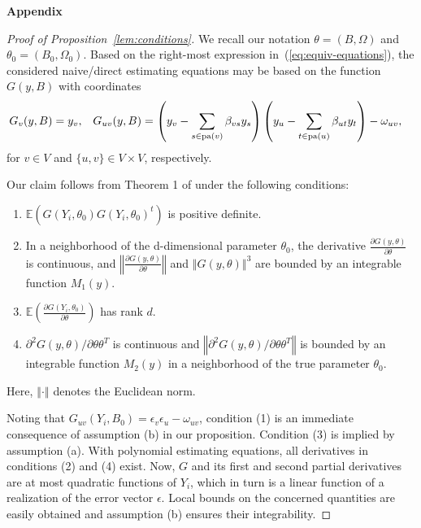 \documentclass[notitlepage]{article}
\newcommand{\pa}{{\rm pa}}       %
\begin{document}
\bigskip
{\bf Appendix}
\smallskip

\begin{proof}[Proof of Proposition~\ref{lem:conditions}]
  We recall our notation $\theta=(B,\Omega)$ and
  $\theta_0=(B_0,\Omega_0)$.  Based on the right-most expression
  in~(\ref{eq:equiv-equations}), the considered naive/direct
  estimating equations may be based on the function $G(y,B)$ with
  coordinates
  \begin{align*}
    G_v(y, B) &= y_v, & G_{uv}(y,B) &= \left(y_v-
      \sum_{s\in\pa(v)}\beta_{vs}y_s\right)\left(y_u-
      \sum_{t\in\pa(u)}\beta_{ut}y_t\right) -\omega_{uv},
  \end{align*}
  for $v\in V$ and $\{u,v\} \in V \times V$, respectively.

  Our claim follows from Theorem 1 of \citet{qin1994empirical} under
  the following conditions:
  \begin{enumerate}[label=(\arabic*)]
  \item $\mathbb{E}(G(Y_i, \theta_0)G(Y_i, \theta_0)^t)$ is positive definite.
  \item In a neighborhood of the d-dimensional parameter $\theta_0$,
    the derivative $\frac{\partial G(y, \theta)}{\partial \theta}$ is
    continuous, and
    $\left\Vert \frac{\partial G(y, \theta)}{\partial \theta}
    \right\Vert$ and $\left \Vert G(y, \theta)\right\Vert^3$ are
    bounded by an integrable function $M_1(y)$.
  \item $\mathbb{E}\left( \frac{\partial G(Y_i, \theta_0)}{\partial \theta}\right)$ has rank $d$.
  \item $\partial^2 G(y, \theta) / \partial \theta \theta^T$ is continuous and $\left\Vert\partial^2 G(y, \theta) / \partial \theta \theta^T \right\Vert$ is bounded by an integrable function $M_2(y)$ in a neighborhood of the true parameter $\theta_0$.
  \end{enumerate}
  Here, $\left\Vert \cdot \right\Vert$ denotes the Euclidean norm.

  Noting that $G_{uv}(Y_i,B_0)=\epsilon_v\epsilon_u-\omega_{uv}$,
  condition (1) is an immediate consequence of assumption (b) in our
  proposition.  Condition (3) is implied by assumption (a).  With
  polynomial estimating equations, all derivatives in conditions (2)
  and (4) exist.  Now, $G$ and its first and second partial derivatives are at most quadratic
  functions of $Y_i$, which in turn is a linear function of a
  realization of the error vector $\epsilon$.  Local bounds on the
  concerned quantities are easily obtained and assumption (b) ensures
  their integrability.
\end{proof}
\end{document}
